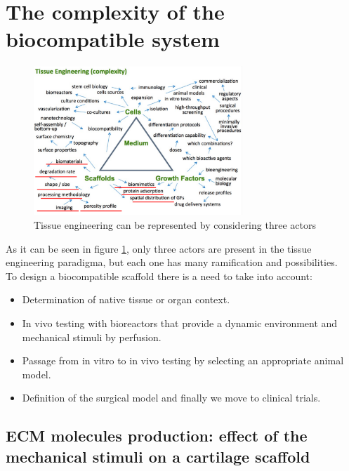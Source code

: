 \section{The complexity of the biocompatible system}

\begin{figure}[ht]
	\centering
	\includegraphics[width=0.7\textwidth]{piramide_completa.png}
	\caption{Tissue engineering can be represented by considering three actors\label{fig:complete_pyramid}}
\end{figure}

As it can be seen in figure \ref{fig:complete_pyramid}, only three actors are present in the tissue engineering paradigma, but each one has many ramification and possibilities.
\\
To design a biocompatible scaffold there is a need to take into account:

\begin{multicols}{2}
	\begin{itemize}
		\item Determination of native tissue or organ context.
		\item In vivo testing with bioreactors that provide a dynamic environment and mechanical stimuli by perfusion.
		\item Passage from in vitro to in vivo testing by selecting an appropriate animal model.
		\item Definition of the surgical model and finally we move to clinical trials.
	\end{itemize}
\end{multicols}

	\subsection{ECM molecules production: effect of the mechanical stimuli on a cartilage scaffold}

